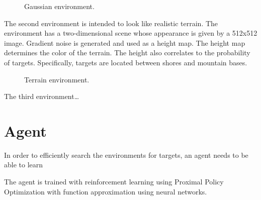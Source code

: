 \begin{figure}
    \centering
    
    \label{fig:gaussian}
    \caption{Gaussian environment.}
\end{figure}

The second environment is intended to look like realistic terrain.
The environment has a two-dimensional scene whose appearance is given by a 512x512 image.
Gradient noise is generated and used as a height map.
The height map determines the color of the terrain.
The height also correlates to the probability of targets.
Specifically, targets are located between shores and mountain bases.

\begin{figure}
    \centering
    
    \label{fig:terrain}
    \caption{Terrain environment.}
\end{figure}

The third environment\dots




\section{Agent}
\label{sec:algorithm}


In order to efficiently search the environments for targets, an agent needs to be able to learn 

The agent is trained with reinforcement learning using Proximal Policy Optimization with function approximation using neural networks. 





